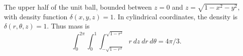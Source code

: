 {
The upper half of the unit ball, bounded between $z= 0$ and $z=\sqrt{1-x^2-y^2}$, with density function $\delta(x,y,z) =1$.
\label{ex:13_07_ex_26} 
}
{In cylindrical coordinates, the density is $\delta(r,\theta,z) = 1$. Thus mass is
$$\int_0^{2\pi}\int_0^1\int_{-\sqrt{1-r^2}}^{\sqrt{1-r^2}} r\ dz\ dr\ d\theta = 4\pi/3.$$
}
